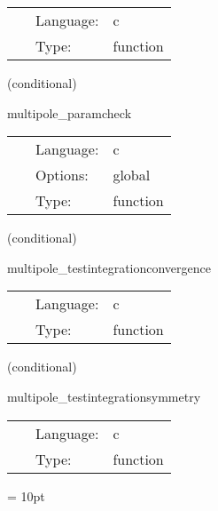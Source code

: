 \documentclass{article}
\begin{document}
\hspace{5mm}

 \begin{tabular*}{160mm}{cll} 
~ & Language:  & c \\ 
~ & Type:  & function \\ 
\end{tabular*} 


\vspace{5mm}

   (conditional) 

\hspace{5mm} multipole\_paramcheck 

\hspace{5mm}{\it check multipole parameters } 


\hspace{5mm}

 \begin{tabular*}{160mm}{cll} 
~ & Language:  & c \\ 
~ & Options:  & global \\ 
~ & Type:  & function \\ 
\end{tabular*} 


\vspace{5mm}

   (conditional) 

\hspace{5mm} multipole\_testintegrationconvergence 

\hspace{5mm}{\it test convergence of integration } 


\hspace{5mm}

 \begin{tabular*}{160mm}{cll} 
~ & Language:  & c \\ 
~ & Type:  & function \\ 
\end{tabular*} 


\vspace{5mm}

   (conditional) 

\hspace{5mm} multipole\_testintegrationsymmetry 

\hspace{5mm}{\it test symmetry of integration } 


\hspace{5mm}

 \begin{tabular*}{160mm}{cll} 
~ & Language:  & c \\ 
~ & Type:  & function \\ 
\end{tabular*} 



\vspace{5mm}\parskip = 10pt 
\end{document}
